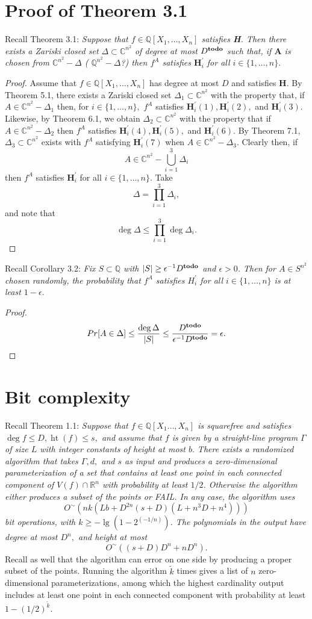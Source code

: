 \documentclass[sigconf]{acmart}
\def\td{{\bf todo}}
\DeclareMathOperator{\htt}{ht}
\def\C{\mathbb{C}}
\def\Q{\mathbb{Q}}
\def\R{\mathbb{R}}
\def\kt{\widetilde{k}}
\def\D{\Delta}
\begin{document}
\section{Proof of Theorem 3.1}
%
Recall Theorem 3.1: \textit{Suppose that $f \in \Q[X_1,\hdots,X_n]$ satisfies \textbf{H}. Then there exists a Zariski closed set $\D \subset \mathbb{C}^{n^2}$ of degree at most $D^{\textrm{\td}}$ such that, if $\textbf{A}$ is chosen from  $\C^{n^2}-\Delta$ ( $\Q^{n^2}-\Delta$?) then $f^A$ satisfies $\textbf{H}_i^{'}$ for all $i \in \{1,\hdots,n\}.$} 
%
\begin{proof}
Assume that $f\in \Q[X_1,\hdots,X_n]$ has degree at most $D$ and satisfies $\textbf{H}.$ By Theorem 5.1, there exists a Zariski closed set $\D_1\subset \C^{n^2}$ with the property that, if $A \in \C^{n^2}-\D_1$ then, for $i \in \{1,\hdots,n\},$ $f^A$ satisfies $\textbf{H}_i^{'}(1), \textbf{H}_i^{'}(2),$ and $\textbf{H}_i^{'}(3).$ Likewise, by Theorem 6.1, we obtain $\D_2 \subset \C^{n^2}$ with the property that if $A \in \C^{n^2}-\D_2$ then $f^A$ satisfies $\textbf{H}_i^{'}(4), \textbf{H}_i^{'}(5),$ and $\textbf{H}_i^{'}(6).$ By Theorem 7.1, $\D_3 \subset \C^{n^2}$ exists with $f^A$ satisfying $\textbf{H}_i^{'}(7)$ when $A \in \C^{n^2}-\D_3$. Clearly then, if 
\[
A \in \C^{n^2} - \bigcup_{i=1}^3 \D_i
\]
then $f^A$ satisfies  $\textbf{H}_i^{'}$ for all $i \in \{1,\hdots,n\}.$ Take 
\[
\Delta = \prod_{i=1}^3 \D_i,
\]
and note that 
\[
\deg \D \leq  \prod_{i=1}^3 \deg \D_i.
\]
\end{proof}
%
Recall Corollary 3.2: \textit{Fix $S \subset \mathbb{Q}$ with $|S| \geq \epsilon^{-1} D^{\textrm{\td}}$ and $\epsilon > 0$. Then for $A\in S^{n^2}$ chosen randomly, the probability that $f^A$ satisfies $H_i^{'}$ for all $i \in \{1,\hdots,n\}$ is at least $1-\epsilon.$}
%
\begin{proof}
\[
Pr[A \in \Delta] \leq \frac{\deg \Delta}{|S|} \leq \frac{D^{\td}}{\epsilon^{-1}D^{\td}} = \epsilon.
\]
\end{proof}
%
%
%
%
\section{Bit complexity}
%
Recall Theorem 1.1: \textit{Suppose that $f\in\Q[X_1\hdots,X_n]$ is squarefree and satisfies $\deg f \leq D, \htt(f) \leq s,$ and assume that $f$ is given by a straight-line program $\Gamma$ of size $L$ with integer constants of height at most $b.$ There exists a randomized algorithm that takes $\Gamma, d,$ and $s$ as input and produces a zero-dimensional parameterization of a set that contains at least one point in each connected component of $V(f) \cap \R^n$ with probability at least $1/2$. Otherwise the algorithm either produces a subset of the points or FAIL. In any case, the algorithm uses 
\[
O^{\sim}(nk(Lb+D^{2n}(s+D)(L+n^3D+n^4)))
\]
bit operations, with $k \geq -\lg(1-2^{(-1/n)})$. The polynomials in the output have degree at most $D^n,$ and height at most
\[
O^{\sim}((s+D)D^n + nD^n).
\]
}
Recall as well that the algorithm can error on one side by producing a proper subset of the points. Running the algorithm $\kt$ times gives a list of $n$ zero-dimensional parameterizations, among which the highest cardinality output includes at least one point in each connected component with probability at least $1-(1/2)^{\kt}.$
%
\end{document}
